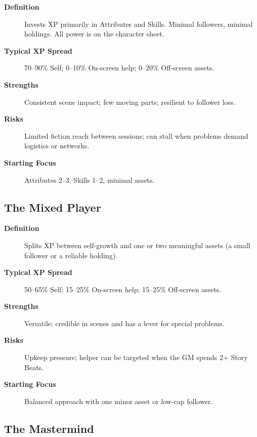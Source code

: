 \begin{description}
    \item[\textbf{Definition}] Invests XP primarily in Attributes and Skills. Minimal followers, minimal holdings. All power is on the character sheet.
    \item[\textbf{Typical XP Spread}] 70--90\% Self; 0--10\% On-screen help; 0--20\% Off-screen assets.
    \item[\textbf{Strengths}] Consistent scene impact; few moving parts; resilient to follower loss.
    \item[\textbf{Risks}] Limited fiction reach between sessions; can stall when problems demand logistics or networks.
    \item[\textbf{Starting Focus}] Attributes 2--3, Skills 1--2, minimal assets.
\end{description}

\subsection{The Mixed Player}\label{subsec:mixed_archetype}

\begin{description}
    \item[\textbf{Definition}] Splits XP between self-growth and one or two meaningful assets (a small follower or a reliable holding).
    \item[\textbf{Typical XP Spread}] 50--65\% Self; 15--25\% On-screen help; 15--25\% Off-screen assets.
    \item[\textbf{Strengths}] Versatile: credible in scenes and has a lever for special problems.
    \item[\textbf{Risks}] Upkeep pressure; helper can be targeted when the GM spends 2+ Story Beats.
    \item[\textbf{Starting Focus}] Balanced approach with one minor asset or low-cap follower.
\end{description}

\subsection{The Mastermind}\label{subsec:mastermind_archetype}


